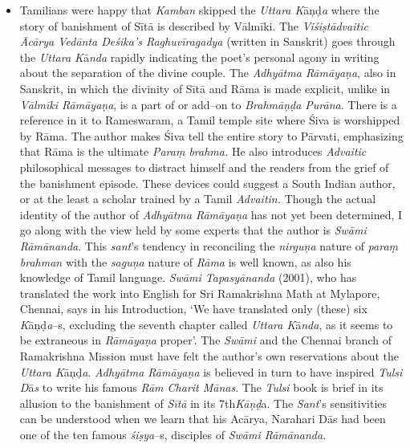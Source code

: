 \begin{itemize}
\item Tamilians were happy that \textit{Kamban} skipped the \textit{Uttara K}āņḍ\textit{a} where the story of banishment of Sītā is described by Vālmīki. The \textit{Viśiṣtādvaitic Ācārya Vedānta Deśika’s Raghuvīragadya} (written in Sanskrit) goes through the \textit{Uttara K}ā\textit{nda} rapidly indicating the poet’s personal agony in writing about the separation of the divine couple. The \textit{Adhyātma Rāmāyaṇa}, also in Sanskrit, in which the divinity of Sītā and Rāma is made explicit, unlike in \textit{Vālmīki Rāmāyaṇa}, is a part of or add–on to\textit{ Brahmāņḍa Purāna}. There is a reference in it to Rameswaram, a Tamil temple site where Śiva is worshipped by Rāma. The author makes Śiva tell the entire story to Pārvati, emphasizing that Rāma is the ultimate \textit{Paraṃ brahma.} He also introduces \textit{Advaitic} philosophical messages to distract himself and the readers from the grief of the banishment episode. These devices could suggest a South Indian author, or at the least a scholar trained by a Tamil \textit{Advaitin.} Though the actual identity of the author of \textit{Adhyātma Rāmāyaṇa} has not yet been determined, I go along with the view held by some experts that the author is \textit{Swāmi Rāmānanda}. This \textit{sant}’s tendency in reconciling the \textit{nirguņa} nature of \textit{paraṃ brahman} with the \textit{saguņa} nature of \textit{Rāma} is well known, as also his knowledge of Tamil language. \textit{Swāmi Tapasyānanda} (2001), who has translated the work into English for Sri Ramakrishna Math at Mylapore, Chennai, says in his Introduction, ‘We have translated only (these) six \textit{K}āņḍ\textit{a}–s, excluding the seventh chapter called \textit{Uttara K}ā\textit{nda}, as it seems to be extraneous in \textit{Rāmāyaṇa} proper’. The \textit{Swāmi} and the Chennai branch of Ramakrishna Mission must have felt the author’s own reservations about the \textit{Uttara K}āņḍ\textit{a}. \textit{Adhyātma Rāmāyaṇa} is believed in turn to have inspired \textit{Tulsi D}ā\textit{s} to write his famous \textit{Rām Charit Mānas}. The \textit{Tulsi} book is brief in its allusion to the banishment of \textit{Sītā} in its 7th\textit{Kāņḍ}a. The \textit{Sant}’s sensitivities can be understood when we learn that his Acārya, Narahari Dās had been one of the ten famous \textit{śiṣya}–s, disciples of \textit{Swāmi Rāmānanda}.

\end{itemize}


